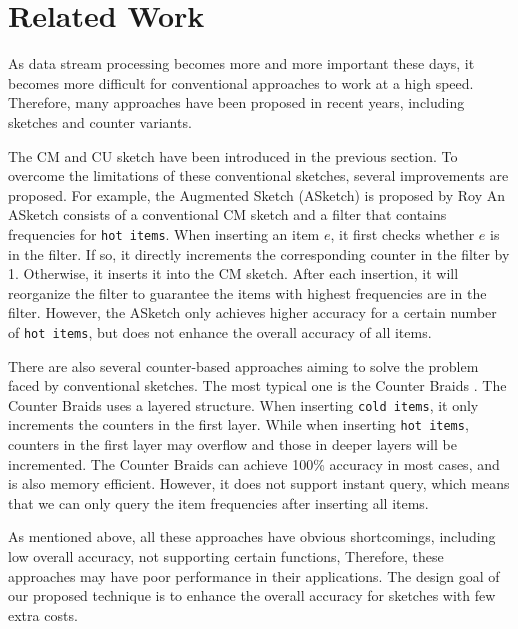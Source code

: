 \presec
\section{Related Work} \postsec

As data stream processing becomes more and more important these days, it becomes more difficult for conventional approaches to work at a high speed. Therefore, many approaches have been proposed in recent years, including sketches and counter variants.

The CM and CU sketch have been introduced in the previous section. To overcome the limitations of these conventional sketches, several improvements are proposed. For example, the Augmented Sketch (ASketch) \cite{roy2016augmented} is proposed by Roy \etal
An ASketch consists of a conventional CM sketch and a filter that contains frequencies for \texttt{hot items}.
When inserting an item $e$, it first checks whether $e$ is in the filter.
If so, it directly increments the corresponding counter in the filter by 1. Otherwise, it inserts it into the CM sketch.
After each insertion, it will reorganize the filter to guarantee the items with highest frequencies are in the filter.
However, the ASketch only achieves higher accuracy for a certain number of \texttt{hot items}, but does not enhance the overall accuracy of all items.

There are also several counter-based approaches aiming to solve the problem faced by conventional sketches.
The most typical one is the Counter Braids \cite{lu2008counter}.
The Counter Braids uses a layered structure.
When inserting \texttt{cold items}, it only increments the counters in the first layer.
While when inserting \texttt{hot items}, counters in the first layer may overflow and those in deeper layers will be incremented.
The Counter Braids can achieve 100\% accuracy in most cases, and is also memory efficient.
However, it does not support instant query, which means that we can only query the item frequencies after inserting all items.

As mentioned above, all these approaches have obvious shortcomings, including low overall accuracy, not supporting certain functions, \etc
Therefore, these approaches may have poor performance in their applications.
The design goal of our proposed technique is to enhance the overall accuracy for sketches with few extra costs.
